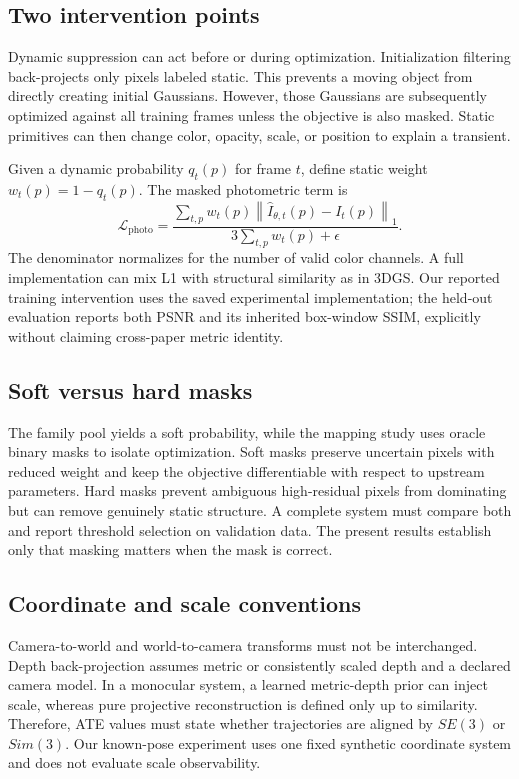 \documentclass[10pt,conference]{IEEEtran}
\begin{document}
\subsection{Two intervention points}
Dynamic suppression can act before or during optimization. Initialization filtering back-projects only pixels labeled static. This prevents a moving object from directly creating initial Gaussians. However, those Gaussians are subsequently optimized against all training frames unless the objective is also masked. Static primitives can then change color, opacity, scale, or position to explain a transient.

Given a dynamic probability $q_t(p)$ for frame $t$, define static weight $w_t(p)=1-q_t(p)$. The masked photometric term is
\begin{equation}
\mathcal L_{\mathrm{photo}}=
\frac{\sum_{t,p}w_t(p)\left\lVert \hat I_{\theta,t}(p)-I_t(p)\right\rVert_1}
{3\sum_{t,p}w_t(p)+\epsilon}.
\label{eq:masked}
\end{equation}
The denominator normalizes for the number of valid color channels. A full implementation can mix L1 with structural similarity as in 3DGS. Our reported training intervention uses the saved experimental implementation; the held-out evaluation reports both PSNR and its inherited box-window SSIM, explicitly without claiming cross-paper metric identity.

\subsection{Soft versus hard masks}
The family pool yields a soft probability, while the mapping study uses oracle binary masks to isolate optimization. Soft masks preserve uncertain pixels with reduced weight and keep the objective differentiable with respect to upstream parameters. Hard masks prevent ambiguous high-residual pixels from dominating but can remove genuinely static structure. A complete system must compare both and report threshold selection on validation data. The present results establish only that masking matters when the mask is correct.

\subsection{Coordinate and scale conventions}
Camera-to-world and world-to-camera transforms must not be interchanged. Depth back-projection assumes metric or consistently scaled depth and a declared camera model. In a monocular system, a learned metric-depth prior can inject scale, whereas pure projective reconstruction is defined only up to similarity. Therefore, ATE values must state whether trajectories are aligned by $SE(3)$ or $Sim(3)$. Our known-pose experiment uses one fixed synthetic coordinate system and does not evaluate scale observability.
\end{document}
